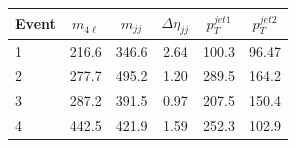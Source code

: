 \begin{table}[htbH]
\begin{center}
\begin{tabular}{lccccc}
\hline Event & $m_{4\ell}$ & $m_{jj}$  & $\Delta\eta_{jj}$ & $p_T^{jet1}$ & $p_T^{jet2}$\\
\hline 1 & 216.6 & 346.6 & 2.64 & 100.3 & 96.47 \\
\hline 2 & 277.7 & 495.2 & 1.20 & 289.5 & 164.2 \\
\hline 3 & 287.2 & 391.5 & 0.97 & 207.5 & 150.4 \\
\hline 4 & 442.5 & 421.9 & 1.59 & 252.3 & 102.9\\
\hline
\end{tabular}
\end{center}
\end{table}


